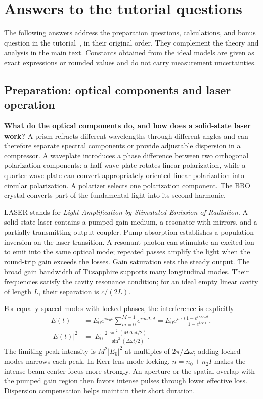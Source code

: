 \clearpage
\section{Answers to the tutorial questions}\label{sec:tutorial-answers}
The following answers address the preparation questions, calculations, and bonus question in the tutorial~\cite{tutorial}, in their original order. They complement the theory and analysis in the main text. Constants obtained from the ideal models are given as exact expressions or rounded values and do not carry measurement uncertainties.

\subsection{Preparation: optical components and laser operation}
\textbf{What do the optical components do, and how does a solid-state laser work?}
A prism refracts different wavelengths through different angles and can therefore separate spectral components or provide adjustable dispersion in a compressor. A waveplate introduces a phase difference between two orthogonal polarization components: a half-wave plate rotates linear polarization, while a quarter-wave plate can convert appropriately oriented linear polarization into circular polarization. A polarizer selects one polarization component. The BBO crystal converts part of the fundamental light into its second harmonic.

LASER stands for \emph{Light Amplification by Stimulated Emission of Radiation}. A solid-state laser contains a pumped gain medium, a resonator with mirrors, and a partially transmitting output coupler. Pump absorption establishes a population inversion on the laser transition. A resonant photon can stimulate an excited ion to emit into the same optical mode; repeated passes amplify the light when the round-trip gain exceeds the losses. Gain saturation sets the steady output. The broad gain bandwidth of Ti:sapphire supports many longitudinal modes. Their frequencies satisfy the cavity resonance condition; for an ideal empty linear cavity of length $L$, their separation is $c/(2L)$.

For equally spaced modes with locked phases, the interference is explicitly
\begin{align}
E(t)&=E_0e^{i\omega_0t}\sum_{m=0}^{M-1}e^{im\Delta\omega t}
=E_0e^{i\omega_0t}\frac{1-e^{iM\Delta\omega t}}{1-e^{i\Delta\omega t}},\\
|E(t)|^2&=|E_0|^2
\frac{\sin^2(M\Delta\omega t/2)}{\sin^2(\Delta\omega t/2)}.
\end{align}
The limiting peak intensity is $M^2|E_0|^2$ at multiples of $2\pi/\Delta\omega$; adding locked modes narrows each peak. In Kerr-lens mode locking, $n=n_0+n_2I$ makes the intense beam center focus more strongly. An aperture or the spatial overlap with the pumped gain region then favors intense pulses through lower effective loss. Dispersion compensation helps maintain their short duration.

